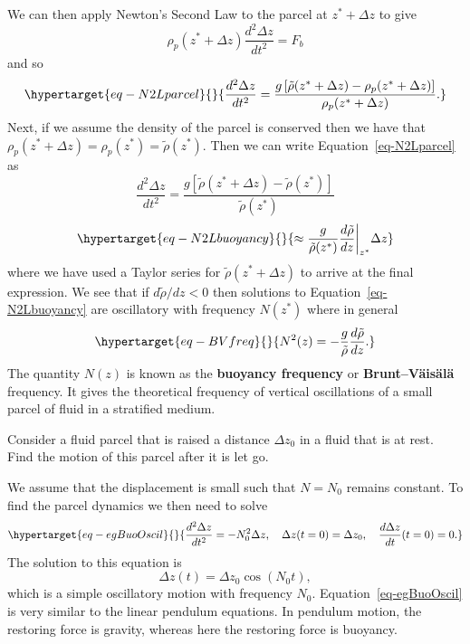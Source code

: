 \documentclass[
  letterpaper,
  twocolumn,
  landscape]{report}
\begin{document}
We can then apply Newton's Second Law to the parcel at \(z^*+\Delta z\)
to give \[
    \rho_p(z^* +\Delta z) \frac{d^2 \Delta z}{dt^2} = F_b
\] and so \begin{equation}\protect\hypertarget{eq-N2Lparcel}{}{
\frac{d^2 \Delta z}{dt^2}  = \frac{g\left[ \tilde \rho(z^* +\Delta z) -  \rho_p( z^* +\Delta z) \right]}{\rho_p(z^* +\Delta z) }.
}\label{eq-N2Lparcel}\end{equation} Next, if we assume the density of
the parcel is conserved then we have that
\(\rho_p(z^* +\Delta z)=\rho_p(z^*)=\tilde\rho(z^*)\). Then we can write
Equation~\ref{eq-N2Lparcel} as \[
\frac{d^2 \Delta z}{dt^2}  = \frac{g\left[ \tilde \rho(z^* +\Delta z) -  \tilde\rho( z^*) \right]}{\tilde\rho(z^*) }\]
\begin{equation}\protect\hypertarget{eq-N2Lbuoyancy}{}{ \approx\frac{g}{\tilde\rho(z^*)}\frac{d\tilde\rho}{dz}\bigg |_{z^*}\Delta z }\label{eq-N2Lbuoyancy}\end{equation}
where we have used a Taylor series for \(\tilde\rho(z^* +\Delta z)\) to
arrive at the final expression. We see that if \({d\tilde\rho}/{dz}<0\)
then solutions to Equation~\ref{eq-N2Lbuoyancy} are oscillatory with
frequency \(N(z^*)\) where in general
\begin{equation}\protect\hypertarget{eq-BVfreq}{}{
N^2(z) = -\frac{g}{\tilde\rho}\frac{d\tilde\rho}{dz}.
}\label{eq-BVfreq}\end{equation} The quantity \(N(z)\) is known as the
\textbf{buoyancy frequency} or \textbf{Brunt--Väisälä} frequency. It
gives the theoretical frequency of vertical oscillations of a small
parcel of fluid in a stratified medium.

\begin{tcolorbox}[enhanced jigsaw, left=2mm, opacityback=0, coltitle=black, bottomtitle=1mm, title={Example}, toprule=.15mm, colbacktitle=quarto-callout-tip-color!10!white, breakable, arc=.35mm, titlerule=0mm, colback=white, toptitle=1mm, opacitybacktitle=0.6, rightrule=.15mm, bottomrule=.15mm, colframe=quarto-callout-tip-color-frame, leftrule=.75mm]

Consider a fluid parcel that is raised a distance \(\Delta z_0\) in a
fluid that is at rest. Find the motion of this parcel after it is let
go.

We assume that the displacement is small such that \(N = N_0\) remains
constant. To find the parcel dynamics we then need to solve
\begin{equation}\protect\hypertarget{eq-egBuoOscil}{}{
    \frac{d^2 \Delta z}{dt^2}  = - N_0^2 \Delta z, \quad \Delta z (t=0) = \Delta z_0, \quad \frac{d \Delta z}{dt}  (t=0) = 0. 
}\label{eq-egBuoOscil}\end{equation} The solution to this equation is \[
    \Delta z(t) = \Delta z_0 \cos{(N_0 t)},
\] which is a simple oscillatory motion with frequency \(N_0\).
Equation~\ref{eq-egBuoOscil} is very similar to the linear pendulum
equations. In pendulum motion, the restoring force is gravity, whereas
here the restoring force is buoyancy.

\end{tcolorbox}
\end{document}
